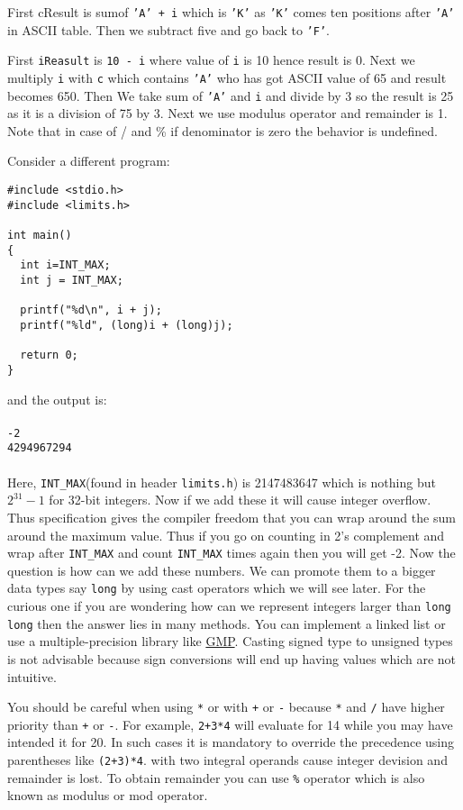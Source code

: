 First cResult is sumof \texttt{'A' + i} which is \texttt{'K'} as \texttt{'K'}
comes ten positions after \texttt{'A'} in ASCII table. Then we subtract five and
go back to \texttt{'F'}.

First \texttt{iReasult} is \texttt{10 - i} where value of \texttt{i} is 10
hence result is 0. Next we multiply \texttt{i} with \texttt{c} which
contains \texttt{'A'} who has got ASCII value of 65 and result becomes
650. Then We take sum of \texttt{'A'} and  \texttt{i} and divide by 3 so the
result is 25 as it is a division of 75 by 3. Next we use modulus operator and
remainder is 1. Note that in case of / and \% if denominator is zero the
behavior is undefined.

Consider a different program:

\begin{verbatim}
#include <stdio.h>
#include <limits.h>

int main()
{
  int i=INT_MAX;
  int j = INT_MAX;

  printf("%d\n", i + j);
  printf("%ld", (long)i + (long)j);

  return 0;
}
\end{verbatim}

and the output is:
\\\\\texttt{-2\\
4294967294\\\\}
Here, \texttt{INT\_MAX}(found in header \texttt{limits.h}) is 2147483647 which 
is nothing but $2^{31} - 1$ for
32-bit integers. Now if we add these it will cause integer overflow. Thus
specification gives the compiler freedom that you can wrap around the sum
around the maximum value. Thus if you go on counting in 2's complement and wrap
after \texttt{INT\_MAX} and count \texttt{INT\_MAX} times again then you will
get -2. Now the question is how can we add these numbers. We can promote them
to a bigger data types say \texttt{long} by using cast operators which we will
see later. For the curious one if you are wondering how can we represent 
integers larger than \texttt{long long} then the answer lies in many methods. 
You can implement a linked list or use  a multiple-precision library like 
\href{https://gmplib.org/}{GMP}. Casting signed type to unsigned types is not 
advisable because sign conversions will end up having values which are not 
intuitive.

You should be careful when using \texttt{*} or \texttt{\/} with \texttt{+} or
\texttt{-} because \texttt{*} and \texttt{/} have higher 
priority than \texttt{+} or \texttt{-}. For example, \texttt{2+3*4} will
evaluate for 14 while you may 
have intended it for 20. In such cases it is mandatory to override the
precedence using parentheses like \texttt{(2+3)*4}. \texttt{\/} with two
integral operands cause 
integer devision and remainder is lost. To obtain remainder you can use
\texttt{\%} operator which is also known as modulus or mod operator.

